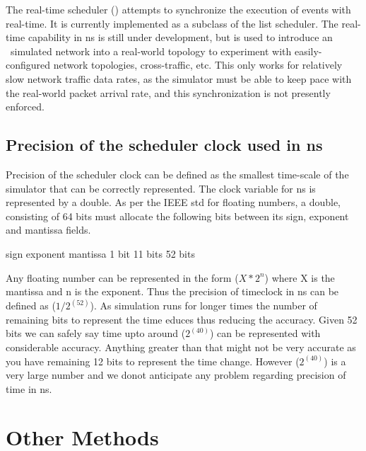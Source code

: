 The real-time scheduler ()
attempts to synchronize the execution of events with real-time.
It is currently implemented as a subclass of the list scheduler.
The real-time capability in ns is still under development, but is used
to introduce an \ns\ simulated network into a real-world topology
to experiment with easily-configured network topologies, cross-traffic, etc. 
This only works for relatively slow network traffic data rates, as the
simulator must be able to keep pace with the real-world packet arrival
rate, and this synchronization is not presently enforced.


\subsection{Precision of the scheduler clock used in ns}
\label{sec:precision}

Precision of the scheduler clock can be defined as the smallest time-scale 
of the simulator that can be correctly represented. The clock variable for 
ns is represented by a double. As per the IEEE std for floating numbers, 
a double, consisting of 64 bits must allocate the following bits between 
its sign, exponent and mantissa fields.

\begin{program}

sign     exponent      mantissa
 1 bit   11 bits        52 bits
\end{program}

Any floating number can be represented in the form ($X * 2^n$) where 
X is the mantissa and n is the exponent. Thus the precision of timeclock in ns can be defined as ($1/2^(52)$).
As simulation runs for longer times the number of remaining bits to represent 
the time educes thus reducing the accuracy. Given 52 bits we can safely say 
time upto around ($2^(40)$) can be represented with considerable accuracy. 
Anything greater than that might not be very accurate as you have remaining 12 
bits to represent the time change. However ($2^(40)$) is a very large number and 
we donot anticipate any problem regarding precision of time in ns.


\section{Other Methods}
\label{sec:other}

